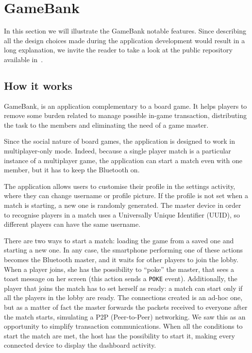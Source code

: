 \section{GameBank}
\label{game_bank}

In this section we will illustrate the GameBank notable features. Since 
describing all the design choices made during the application development would 
result in a long explanation, we invite the reader to take a look at the public 
repository available in~\cite{gamebank18}.

\subsection{How it works}

GameBank, is an application complementary to a board game. It helps players 
to remove some burden related to manage possible in-game transaction, 
distributing the task to the members and eliminating the need of a game master.

Since the social nature of board games, the application is designed to work 
in multiplayer-only mode. Indeed, because a single player match is a particular 
instance of a multiplayer game, the application can start a match even with one 
member, but it has to keep the Bluetooth on.

The application allows users to customise their profile in the settings 
activity, where they can change username or profile picture. If the profile is 
not set when a match is starting, a new one is randomly generated. The master 
device in order to recognise players in a match uses a Universally Unique 
Identifier (UUID), so different players can have the same username.

There are two ways to start a match: loading the game from a saved one and 
starting a new one. In any case, the smartphone performing one of these actions 
becomes the Bluetooth master, and it waits for other players to join 
the lobby. When a player joins, she has the possibility to ``poke'' the master, 
that sees a toast message on her screen (this action sends a \texttt{POKE} 
event). Additionally, the player that joins the match has to set herself as 
ready: a match can start only if all the players in the lobby are ready. 
The connections created is an ad-hoc one, but as a matter of fact the master 
forwards the packets received to everyone after the match starts, simulating 
a P2P (Peer-to-Peer) networking. We saw this as an opportunity to simplify 
transaction communications.
When all the conditions to start the match are met, the host has the 
possibility to start it, making every connected device to display the dashboard 
activity.


